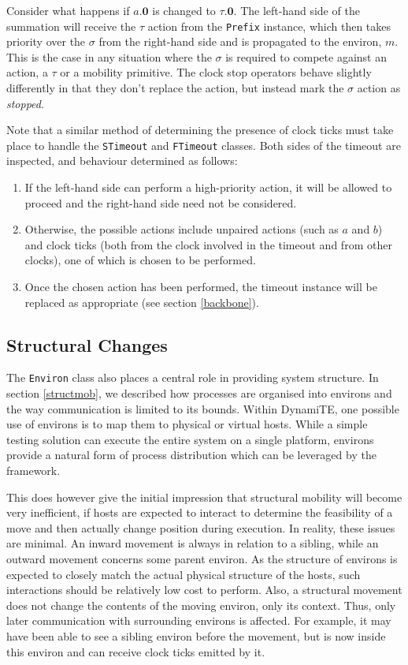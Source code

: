\documentclass{sig-alternate}
\newcommand{\nil}{\textbf{0}}
\begin{document}
Consider what happens if $a.\nil$ is changed to $\tau.\nil$.  The
left-hand side of the summation will receive the $\tau$ action from the
\texttt{Prefix} instance, which then takes priority over the $\sigma$
from the right-hand side and is propagated to the environ, $m$.  This is
the case in any situation where the $\sigma$ is required to compete
against an action, a $\tau$ or a mobility primitive.  The clock stop
operators behave slightly differently in that they don't replace the
action, but instead mark the $\sigma$ action as \emph{stopped}.

Note that a similar method of determining the presence of clock ticks
must take place to handle the \texttt{STimeout} and \texttt{FTimeout}
classes.  Both sides of the timeout are inspected, and behaviour
determined as follows:
\begin{enumerate}
\item If the left-hand side can perform a high-priority action, it will
      be allowed to proceed and the right-hand side need not be
      considered.
\item Otherwise, the possible actions include unpaired actions (such as
      $a$ and $b$) and clock ticks (both from the clock involved in the
      timeout and from other clocks), one of which is chosen to be
      performed.
\item Once the chosen action has been performed, the timeout instance
      will be replaced as appropriate (see section \ref{backbone}). 
\end{enumerate}

\subsection{Structural Changes}
\label{structchange}

The \texttt{Environ} class also places a central role in providing
system structure.  In section \ref{structmob}, we described how
processes are organised into environs and the way communication is
limited to its bounds.  Within DynamiTE, one possible use of environs
is to map them to physical or virtual hosts.  While a simple testing
solution can execute the entire system on a single platform, environs
provide a natural form of process distribution which can be leveraged by
the framework.

This does however give the initial impression that structural mobility
will become very inefficient, if hosts are expected to interact to
determine the feasibility of a move and then actually change position
during execution.  In reality, these issues are minimal.  An inward
movement is always in relation to a sibling, while an outward movement
concerns some parent environ.  As the structure of environs is expected
to closely match the actual physical structure of the hosts, such
interactions should be relatively low cost to perform.  Also, a
structural movement does not change the contents of the moving environ,
only its context.  Thus, only later communication with surrounding
environs is affected.  For example, it may have been able to see a
sibling environ before the movement, but is now inside this environ and
can receive clock ticks emitted by it.
\end{document}
